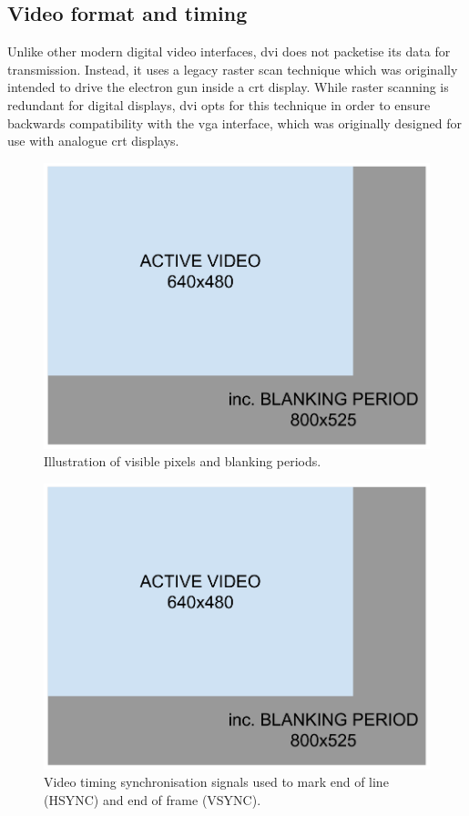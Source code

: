 \subsection{Video format and timing}

Unlike other modern digital video interfaces, \gls{dvi} does not packetise its data for transmission. Instead, it uses a legacy raster scan technique which was originally intended to drive the electron gun inside a \gls{crt} display. While raster scanning is redundant for digital displays, \gls{dvi} opts for this technique in order to ensure backwards compatibility with the \gls{vga} interface, which was originally designed for use with analogue \gls{crt} displays.

\begin{figure}
  \centering
  \includegraphics[width=1\textwidth]{./img/raster_scan.png}
  \caption{Illustration of visible pixels and blanking periods.}
  \label{fig:raster_scan}
\end{figure}

\begin{figure}
  \centering
  \includegraphics[width=1\textwidth]{./img/raster_scan.png}
  \caption{Video timing synchronisation signals used to mark end of line (HSYNC) and end of frame (VSYNC).}
  \label{fig:video_timing_signals}
\end{figure}

